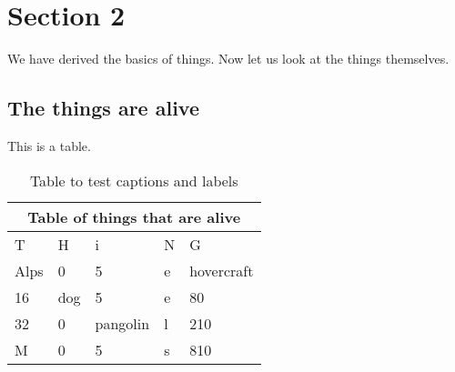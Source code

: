 \chapter{Section 2}

We have derived the basics of things.
Now let us look at the things themselves.

\section{The things are alive}

This is a table.

\begin{table}[h!]
\centering
\begin{tabular}{ |p{1cm}||p{2cm}|p{2cm}|p{5cm}|p{3cm}| }
 \hline
 \multicolumn{5}{|c|}{Table of things that are alive} \\
 \hline
 T & H & i & N & G \\
 \hline
 Alps   & 0  & 5 &  e & hovercraft\\
 16   & dog  & 5 &  e & 80\\
 32   & 0  & pangolin &  l & 210\\
 M   & 0  & 5 &  s & 810\\
 \hline
\end{tabular}
\caption{Table to test captions and labels}
\label{table:1}
\end{table}